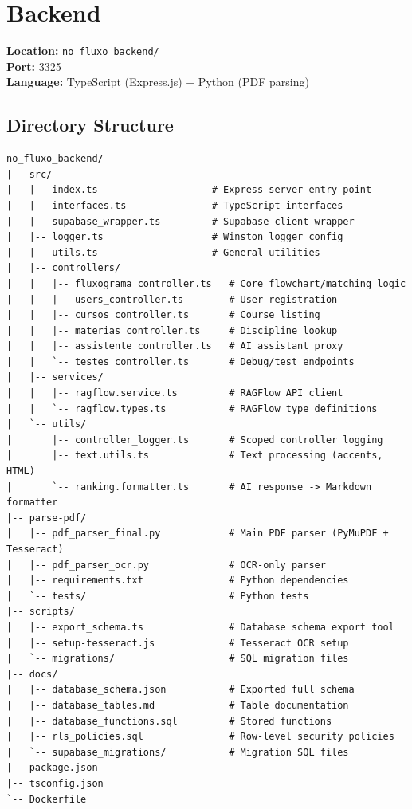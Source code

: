 \documentclass[11pt,a4paper]{article}
\newcommand{\code}[1]{\texttt{#1}}
\begin{document}
\section{Backend}

\noindent\textbf{Location:} \code{no\_fluxo\_backend/}\\
\textbf{Port:} 3325\\
\textbf{Language:} TypeScript (Express.js) + Python (PDF parsing)

\subsection{Directory Structure}

\begin{lstlisting}
no_fluxo_backend/
|-- src/
|   |-- index.ts                    # Express server entry point
|   |-- interfaces.ts               # TypeScript interfaces
|   |-- supabase_wrapper.ts         # Supabase client wrapper
|   |-- logger.ts                   # Winston logger config
|   |-- utils.ts                    # General utilities
|   |-- controllers/
|   |   |-- fluxograma_controller.ts   # Core flowchart/matching logic
|   |   |-- users_controller.ts        # User registration
|   |   |-- cursos_controller.ts       # Course listing
|   |   |-- materias_controller.ts     # Discipline lookup
|   |   |-- assistente_controller.ts   # AI assistant proxy
|   |   `-- testes_controller.ts       # Debug/test endpoints
|   |-- services/
|   |   |-- ragflow.service.ts         # RAGFlow API client
|   |   `-- ragflow.types.ts           # RAGFlow type definitions
|   `-- utils/
|       |-- controller_logger.ts       # Scoped controller logging
|       |-- text.utils.ts              # Text processing (accents, HTML)
|       `-- ranking.formatter.ts       # AI response -> Markdown formatter
|-- parse-pdf/
|   |-- pdf_parser_final.py            # Main PDF parser (PyMuPDF + Tesseract)
|   |-- pdf_parser_ocr.py              # OCR-only parser
|   |-- requirements.txt               # Python dependencies
|   `-- tests/                         # Python tests
|-- scripts/
|   |-- export_schema.ts               # Database schema export tool
|   |-- setup-tesseract.js             # Tesseract OCR setup
|   `-- migrations/                    # SQL migration files
|-- docs/
|   |-- database_schema.json           # Exported full schema
|   |-- database_tables.md             # Table documentation
|   |-- database_functions.sql         # Stored functions
|   |-- rls_policies.sql               # Row-level security policies
|   `-- supabase_migrations/           # Migration SQL files
|-- package.json
|-- tsconfig.json
`-- Dockerfile
\end{lstlisting}
\end{document}
